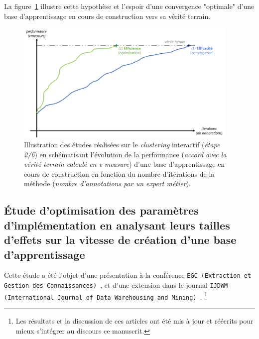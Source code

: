 \begin{tcolorbox}[
		title=\faVial~\textbf{Hypothèse d'efficience}~\faVial,
		colback=colorTcolorboxHypothesis!15,
		colframe=colorTcolorboxHypothesis!75,
		width=\linewidth
	]
		La figure~\ref{figure:4.2-HYPOTHESE-EFFICIENCE} illustre cette hypothèse et l'espoir d'une convergence "optimale" d'une base d'apprentissage en cours de construction vers sa vérité terrain.
		\begin{figure}[H]  %
			\centering
			\includegraphics[width=0.95\textwidth]{figures/hypotheses-02-efficience}
			\caption{Illustration des études réalisées sur le \textit{clustering} interactif (\textit{étape 2/6}) en schématisant l'évolution de la performance (\textit{accord avec la vérité terrain calculé en v-measure}) d'une base d'apprentissage en cours de construction en fonction du nombre d'itérations de la méthode (\textit{nombre d'annotations par un expert métier}).}
			\label{figure:4.2-HYPOTHESE-EFFICIENCE}
		\end{figure}

	\end{tcolorbox}
	
	\subsection{Étude d'optimisation des paramètres d’implémentation en analysant leurs tailles d'effets sur la vitesse de création d'une base d'apprentissage}
	\label{section:4.2.1-ETUDE-OPTIMISATION}
			
		\begin{leftBarInformation}
			Cette étude a été l'objet d'une présentation à la conférence \texttt{EGC (Extraction et Gestion des Connaissances)}~\citep{schild:conception-interactive-clustering:2021}, et d'une extension dans le journal \texttt{IJDWM (International Journal of Data Warehousing and Mining)}~\citep{schild:extension-interactive-clustering:2022}.
			\footnote{Les résultats et la discussion de ces articles ont été mis à jour et réécrits pour mieux s'intégrer au discours ce manuscrit.}
		\end{leftBarInformation}

